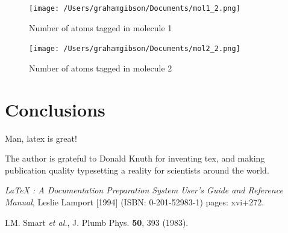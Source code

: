 \documentclass[aps,floatfix,prd,showpacs]{revtex4}
\begin{document}
\begin{figure}[ht]
\texttt{[image: /Users/grahamgibson/Documents/mol1\_2.png]}
\caption{Number of atoms tagged in molecule 1}
\label{Addition}
\end{figure}


\begin{figure}[ht]
\texttt{[image: /Users/grahamgibson/Documents/mol2\_2.png]}
\caption{Number of atoms tagged in molecule 2}
\label{Addition}
\end{figure}




\section{Conclusions}

Man, latex is great!

\acknowledgments
The author is grateful to Donald Knuth for inventing tex, and making publication quality typesetting a reality for scientists around the world.


\begin{thebibliography}{99}

 {\sl LaTeX : A Documentation Preparation System User's Guide and Reference Manual}, Leslie Lamport [1994] (ISBN: 0-201-52983-1) pages: xvi+272.

I.M. Smart {\it et al.}, J. Plumb Phys. {\bf 50}, 393 (1983).

\end{thebibliography}
\end{document}
